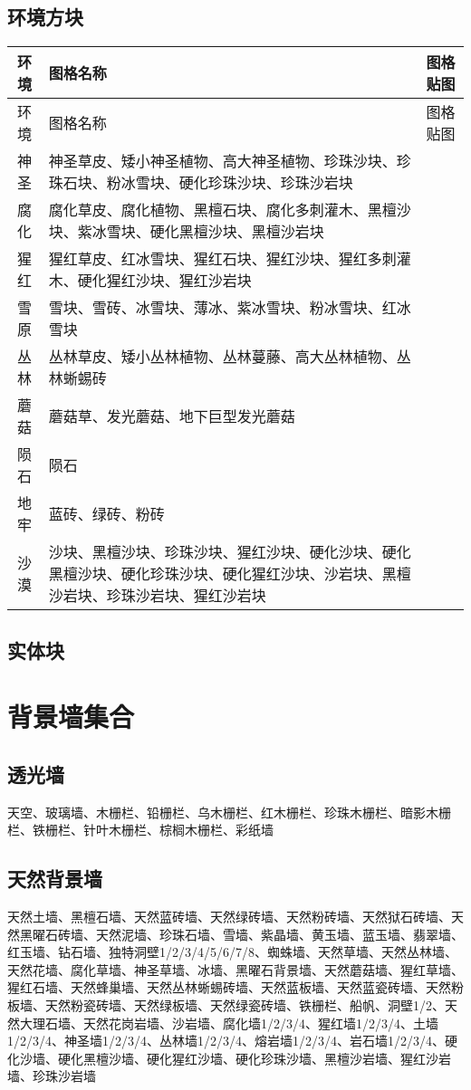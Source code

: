 \subsection{环境方块}
\begin{longtable}{|c|p{}|p{}|}
\hline 环境&图格名称&图格贴图\\\hline
\endfirsthead
\hline 环境&图格名称&图格贴图\\\hline
\endhead
\hline
\endfoot
神圣&神圣草皮、矮小神圣植物、高大神圣植物、珍珠沙块、珍珠石块、粉冰雪块、硬化珍珠沙块、珍珠沙岩块&\\\hline
腐化&腐化草皮、腐化植物、黑檀石块、腐化多刺灌木、黑檀沙块、紫冰雪块、硬化黑檀沙块、黑檀沙岩块&\\\hline
猩红&猩红草皮、红冰雪块、猩红石块、猩红沙块、猩红多刺灌木、硬化猩红沙块、猩红沙岩块&\\\hline
雪原&雪块、雪砖、冰雪块、薄冰、紫冰雪块、粉冰雪块、红冰雪块&\\\hline
丛林&丛林草皮、矮小丛林植物、丛林蔓藤、高大丛林植物、丛林蜥蜴砖&\\\hline
蘑菇&蘑菇草、发光蘑菇、地下巨型发光蘑菇&\\\hline
陨石&陨石&\\\hline
地牢&蓝砖、绿砖、粉砖&\\\hline
沙漠&沙块、黑檀沙块、珍珠沙块、猩红沙块、硬化沙块、硬化黑檀沙块、硬化珍珠沙块、硬化猩红沙块、沙岩块、黑檀沙岩块、珍珠沙岩块、猩红沙岩块
\end{longtable}

\subsection{实体块}


\section{背景墙集合}
\subsection{透光墙}\label{app9}
天空、玻璃墙、木栅栏、铅栅栏、乌木栅栏、红木栅栏、珍珠木栅栏、暗影木栅栏、铁栅栏、针叶木栅栏、棕榈木栅栏、彩纸墙
\subsection{天然背景墙}
天然土墙、黑檀石墙、天然蓝砖墙、天然绿砖墙、天然粉砖墙、天然狱石砖墙、天然黑曜石砖墙、天然泥墙、珍珠石墙、雪墙、紫晶墙、黄玉墙、蓝玉墙、翡翠墙、红玉墙、钻石墙、独特洞壁1/2/3/4/5/6/7/8、蜘蛛墙、天然草墙、天然丛林墙、天然花墙、腐化草墙、神圣草墙、冰墙、黑曜石背景墙、天然蘑菇墙、猩红草墙、猩红石墙、天然蜂巢墙、天然丛林蜥蜴砖墙、天然蓝板墙、天然蓝瓷砖墙、天然粉板墙、天然粉瓷砖墙、天然绿板墙、天然绿瓷砖墙、铁栅栏、船帆、洞壁1/2、天然大理石墙、天然花岗岩墙、沙岩墙、腐化墙1/2/3/4、猩红墙1/2/3/4、土墙1/2/3/4、神圣墙1/2/3/4、丛林墙1/2/3/4、熔岩墙1/2/3/4、岩石墙1/2/3/4、硬化沙墙、硬化黑檀沙墙、硬化猩红沙墙、硬化珍珠沙墙、黑檀沙岩墙、猩红沙岩墙、珍珠沙岩墙

